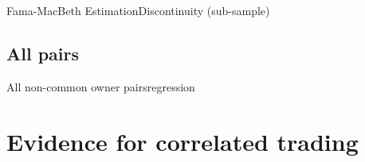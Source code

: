 \documentclass{beamer}
\begin{document}
%
		
		
\begin{frame}{Fama-MacBeth Estimation}{Discontinuity (sub-sample)}
\label{Monthly9} 

\begin{table}[htbp]
	\centering
	\resizebox{0.8\textwidth}{!}{
		
	}
\end{table}	
	\end{frame}

\subsection{All pairs}


\begin{frame}{All non-common owner pairs}{regression}
	\begin{table}[htbp]
		\centering
		\resizebox{1\textwidth}{!}{
			
		}
	\end{table}
\end{frame}


	
	\section{Evidence for correlated trading}
\end{document}

